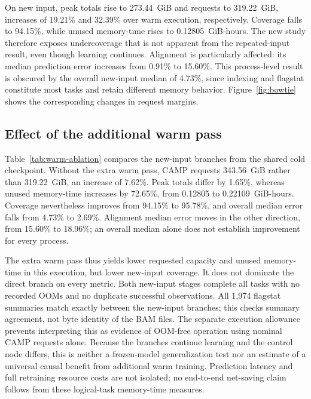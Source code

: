 On new input, peak totals rise to 273.44~GiB and requests to 319.22~GiB,
increases of 19.21\% and 32.39\% over warm execution, respectively.
Coverage falls to 94.15\%, while unused memory-time rises to
0.12805~GiB-hours. The new study therefore exposes undercoverage that is
not apparent from the repeated-input result, even though learning continues.
Alignment is particularly affected: its median prediction error increases
from 0.91\% to 15.60\%. This process-level result is obscured by the overall
new-input median of 4.73\%, since indexing and flagstat constitute most
tasks and retain different memory behavior. Figure~\ref{fig:bowtie} shows
the corresponding changes in request margins.

\subsection{Effect of the additional warm pass}
Table~\ref{tab:warm-ablation} compares the new-input branches from the
shared cold checkpoint. Without the extra warm pass, CAMP requests
343.56~GiB rather than 319.22~GiB, an increase of 7.62\%.
Peak totals differ by 1.65\%, whereas unused memory-time increases by
72.65\%, from 0.12805 to 0.22109~GiB-hours. Coverage nevertheless improves
from 94.15\% to 95.78\%, and overall median error falls from 4.73\% to
2.69\%. Alignment median error moves in the other direction, from
15.60\% to 18.96\%; an overall median alone does not establish improvement
for every process.

\begin{table}[!t]
\caption{Shared-cold-checkpoint ablation on the same 6,000 new-input tasks: Warm-Transfer includes an extra original-data warm pass; Direct-Transfer proceeds directly from cold.}
\label{tab:warm-ablation}
\centering\footnotesize

\end{table}

The extra warm pass thus yields lower requested capacity and unused
memory-time in this execution, but lower new-input coverage. It does not
dominate the direct branch on every metric. Both new-input stages complete
all tasks with no recorded OOMs and no duplicate successful observations.
All 1,974 flagstat summaries match exactly between the new-input branches;
this checks summary agreement, not byte identity of the BAM files.
The separate execution allowance prevents interpreting this as evidence
of OOM-free operation using nominal CAMP requests alone. Because the
branches continue learning and the control node differs, this is neither
a frozen-model generalization test nor an estimate of a universal causal
benefit from additional warm training. Prediction latency and full
retraining resource costs are not isolated; no end-to-end net-saving claim
follows from these logical-task memory-time measures.
